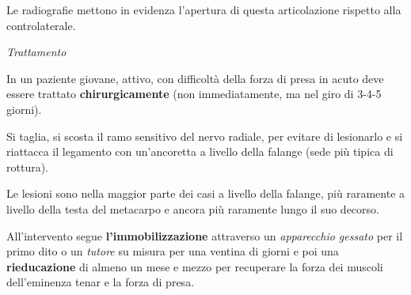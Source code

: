 \documentclass[]{article}
\begin{document}
Le radiografie mettono in evidenza l'apertura di questa articolazione
rispetto alla controlaterale.

\emph{Trattamento}

In un paziente giovane, attivo, con difficoltà della forza di presa in
acuto deve essere trattato \textbf{chirurgicamente} (non immediatamente,
ma nel giro di 3-4-5 giorni).

Si taglia, si scosta il ramo sensitivo del nervo radiale, per evitare di
lesionarlo e si riattacca il legamento con un'ancoretta a livello della
falange (sede più tipica di rottura).

Le lesioni sono nella maggior parte dei casi a livello della falange,
più raramente a livello della testa del metacarpo e ancora più raramente
lungo il suo decorso.

All'intervento segue \textbf{l'immobilizzazione} attraverso un
\emph{apparecchio gessato} per il primo dito o un \emph{tutore} su
misura per una ventina di giorni e poi una \textbf{rieducazione} di
almeno un mese e mezzo per recuperare la forza dei muscoli dell'eminenza
tenar e la forza di presa.
\end{document}
